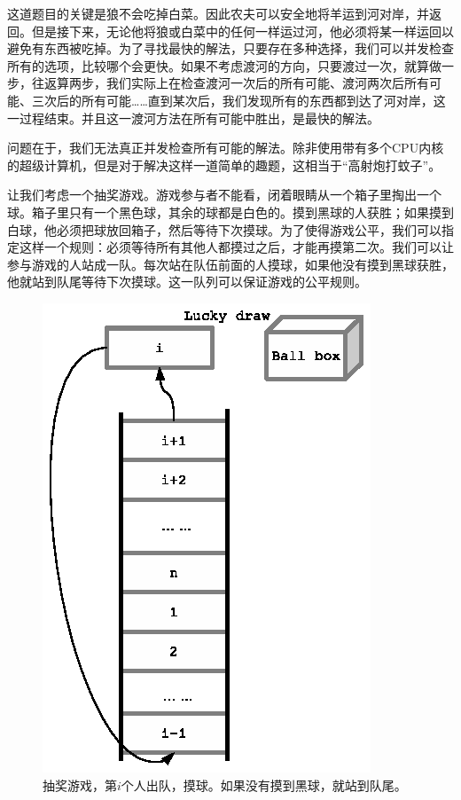 \documentclass[UTF8]{article}
\begin{document}
这道题目的关键是狼不会吃掉白菜。因此农夫可以安全地将羊运到河对岸，并返回。但是接下来，无论他将狼或白菜中的任何一样运过河，他必须将某一样运回以避免有东西被吃掉。为了寻找最快的解法，只要存在多种选择，我们可以并发检查所有的选项，比较哪个会更快。如果不考虑渡河的方向，只要渡过一次，就算做一步，往返算两步，我们实际上在检查渡河一次后的所有可能、渡河两次后所有可能、三次后的所有可能……直到某次后，我们发现所有的东西都到达了河对岸，这一过程结束。并且这一渡河方法在所有可能中胜出，是最快的解法。

问题在于，我们无法真正并发检查所有可能的解法。除非使用带有多个CPU内核的超级计算机，但是对于解决这样一道简单的趣题，这相当于“高射炮打蚊子”。

让我们考虑一个抽奖游戏。游戏参与者不能看，闭着眼睛从一个箱子里掏出一个球。箱子里只有一个黑色球，其余的球都是白色的。摸到黑球的人获胜；如果摸到白球，他必须把球放回箱子，然后等待下次摸球。为了使得游戏公平，我们可以指定这样一个规则：必须等待所有其他人都摸过之后，才能再摸第二次。我们可以让参与游戏的人站成一队。每次站在队伍前面的人摸球，如果他没有摸到黑球获胜，他就站到队尾等待下次摸球。这一队列可以保证游戏的公平规则。

\begin{figure}[htbp]
 \centering
 \includegraphics[scale=1]{img/lucky-draw.eps}
 \caption{抽奖游戏，第$i$个人出队，摸球。如果没有摸到黑球，就站到队尾。}
 \label{fig:luck-draw}
\end{figure}
\end{document}
